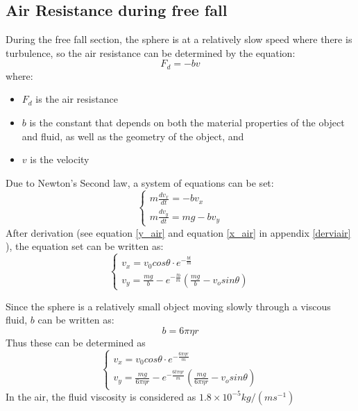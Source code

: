 \documentclass[conference]{IEEEtran}
\begin{document}
    \subsection{Air Resistance during free fall}
During the free fall section, the sphere is at a relatively slow speed where there is turbulence, so the air resistance can be determined by the equation:
\begin{equation}
    F_d = -bv
\end{equation}
where:
\begin{itemize}
    \item $F_d$ is the air resistance
    \item $b$ is the constant that depends on both the material properties of the object and fluid, as well as the geometry of the object, and
    \item $v$ is the velocity
\end{itemize}
Due to Newton's Second law, a system of equations can be set:
\begin{equation*}
    \begin{cases}
    m\frac{dv_x}{dt} = -bv_x\\
    m\frac{dv_y}{dt} = mg-bv_y
    \end{cases}
\end{equation*}
After derivation (see equation \ref{y_air} and equation \ref{x_air} in appendix \ref{derviair} ), the equation set can be written as:
\begin{equation*}
    \begin{cases}
    v_x = v_0cos\theta\cdot e^{-\frac{bt}{m}}\\
    v_y = \frac{mg}{b} - e^{-\frac{tb}{m}}(\frac{mg}{b}-v_osin\theta)
    \end{cases}
\end{equation*}

Since the sphere is a relatively small object moving slowly through a viscous fluid, $b$ can be written as:
\begin{equation}
    b = 6\pi\eta r
\end{equation}
Thus these can be determined as
\begin{equation*}
   \begin{cases}
       v_x = v_0 cos\theta\cdot e^{-\frac{6\pi\eta r}{m}}\\
       v_y = \frac{mg}{6\pi\eta r} - e^{-\frac{6t\pi\eta r}{m}}(\frac{mg}{6\pi\eta r}-v_osin\theta)
   \end{cases} 
\end{equation*}
In the air, the fluid viscosity is considered as $1.8\times10^{-5}kg/(ms^{-1})$
\end{document}
